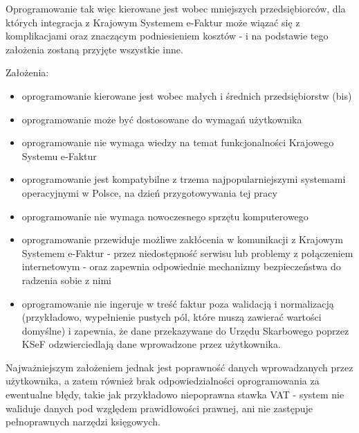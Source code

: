 Oprogramowanie tak więc kierowane jest wobec mniejszych przedsiębiorców, dla których integracja z Krajowym Systemem e-Faktur może wiązać się z komplikacjami oraz znaczącym podniesieniem kosztów - i na podstawie tego założenia zostaną przyjęte wszystkie inne.
\par
Założenia:
\begin{itemize}
    \item oprogramowanie kierowane jest wobec małych i średnich przedsiębiorstw (bis)
    \item oprogramowanie może być dostosowane do wymagań użytkownika %
    \item oprogramowanie nie wymaga wiedzy na temat funkcjonalności Krajowego Systemu e-Faktur
    \item oprogramowanie jest kompatybilne z trzema najpopularniejszymi systemami operacyjnymi w Polsce, na dzień przygotowywania tej pracy \parencite{statcounter_desktop_2025}
    \item oprogramowanie nie wymaga nowoczesnego sprzętu komputerowego %
    \item oprogramowanie przewiduje możliwe zakłócenia w komunikacji z Krajowym Systemem e-Faktur - przez niedostępność serwisu lub problemy z połączeniem internetowym - oraz zapewnia odpowiednie mechanizmy bezpieczeństwa do radzenia sobie z nimi
    \item oprogramowanie nie ingeruje w treść faktur poza walidacją i normalizacją (przykładowo, wypełnienie pustych pól, które muszą zawierać wartości domyślne) i zapewnia, że dane przekazywane do Urzędu Skarbowego poprzez KSeF odzwierciedlają dane wprowadzone przez użytkownika.
\end{itemize}

Najważniejszym założeniem jednak jest poprawność danych wprowadzanych przez użytkownika, a zatem również brak odpowiedzialności oprogramowania za ewentualne błędy, takie jak przykładowo niepoprawna stawka VAT - system nie waliduje danych pod względem prawidłowości prawnej, ani nie zastępuje pełnoprawnych narzędzi księgowych.

